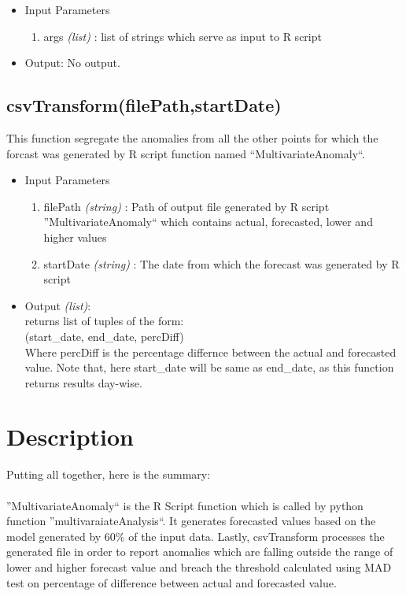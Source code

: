\begin{itemize}
 \item Input Parameters
 
 \begin{enumerate}
  \item args \textit{(list)} : list of strings which serve as input to R script 

 \end{enumerate}

 \item Output: No output.

\end{itemize}

\subsection{csvTransform(filePath,startDate)}

This function segregate the anomalies from all the other points for which the forcast was 
generated by R script function named ``MultivariateAnomaly``.

\begin{itemize}
 \item Input Parameters
 
 \begin{enumerate}
  \item filePath \textit{(string)} : Path of output file generated by R script ''MultivariateAnomaly`` which contains actual, forecasted, lower and higher values  
  \item startDate \textit{(string)} : The date from which the forecast was generated by R script
 \end{enumerate}

 \item Output \textit{(list)}: \\
  returns list of tuples of the form: \\
  (start\_date, end\_date, percDiff) \\
  Where percDiff is the percentage differnce between the actual and forecasted value.
  Note that, here start\_date will be same as end\_date, as this function 
returns results day-wise.
 

\end{itemize}


\section{Description}

Putting all together, here is the summary:\\
\\
''MultivariateAnomaly`` is the R Script function which is called by  python function ''multivaraiateAnalysis``.
It generates forecasted values based on the model generated by 60\% of the input data.
Lastly, csvTransform processes the generated file in order to report anomalies which are falling outside the range of lower
and higher forecast value and breach the threshold calculated using MAD test on percentage of difference between actual and 
forecasted value.